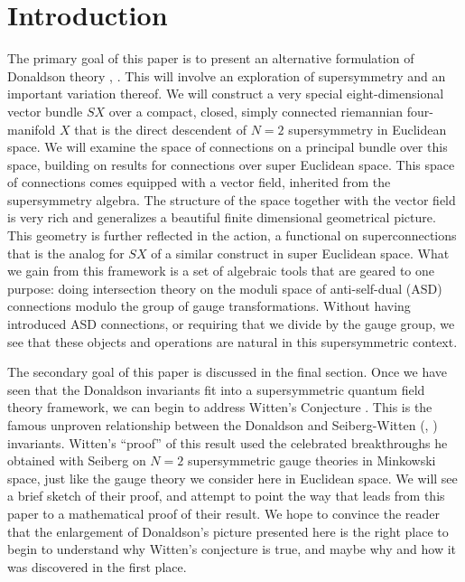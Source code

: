 \documentclass[twoside]{amsart}
\newcommand{\action}{{action}{}}
\begin{document}
\section*{Introduction} The primary goal of this paper is to present an
alternative formulation of Donaldson theory \cite{donaldsonpoly},
\cite{donaldsonkronheimer}.  This will involve an exploration of
supersymmetry and an important variation thereof.  We will construct a
very special eight-dimensional vector bundle \( SX \) over a compact,
closed, simply connected riemannian four-manifold \( X \) that is the
direct descendent of \( N=2 \) supersymmetry in Euclidean space.  We
will examine the space of connections on a principal bundle over this
space, building on results for connections over super Euclidean space.
This space of connections comes equipped with a vector field,
inherited from the supersymmetry algebra.  The structure of the space
together with the vector field is very rich and generalizes a
beautiful finite dimensional geometrical picture.  This geometry is
further reflected in the \action, a functional on superconnections
that is the analog for \( SX \) of a similar construct in super
Euclidean space.  What we gain from this framework is a set of
algebraic tools that are geared to one purpose: doing intersection
theory on the moduli space of anti-self-dual (ASD) connections modulo
the group of gauge transformations.  Without having introduced ASD
connections, or requiring that we divide by the gauge group, we see
that these objects and operations are natural in this supersymmetric
context.

The secondary goal of this paper is discussed in the final section.
Once we have seen that the Donaldson invariants fit into a
supersymmetric quantum field theory framework, we can begin to address
Witten's Conjecture \cite{witten94}.  This is the famous unproven
relationship between the Donaldson and Seiberg-Witten
(\cite{seibergwitten1}, \cite{morgan}) invariants.
Witten's ``proof'' of this result used the celebrated breakthroughs he
obtained with Seiberg \cite{seibergwitten1} on \( N=2 \)
supersymmetric gauge theories in Minkowski space, just like the gauge theory we
consider here in Euclidean space.  We will see a brief sketch of their
proof, and attempt to point the way that leads from this paper to a
mathematical proof of their result.  We hope to convince the reader
that the enlargement of Donaldson's picture presented here is the
right place to begin to understand why Witten's conjecture is true,
and maybe why and how it was discovered in the first place.
\end{document}
